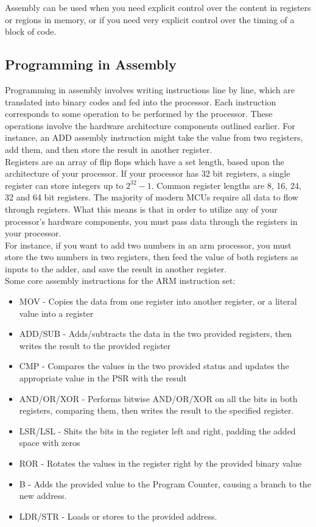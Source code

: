 \documentclass[10pt]{article}
\begin{document}
Assembly can be used when you need explicit control over the content in registers or regions in memory, or if you need very explicit control over the timing of a block of code.\\

\subsection{Programming in Assembly}
Programming in assembly involves writing instructions line by line, which are translated into binary codes and fed into the processor. Each instruction corresponds to some operation to be performed by the processor. These operations involve the hardware architecture components outlined earlier. For instance, an ADD assembly instruction might take the value from two registers, add them, and then store the result in another register. \\

Registers are an array of flip flops which have a set length, based upon the architecture of your processor. If your processor has 32 bit registers, a single register can store integers up to $2^{32}-1$. Common register lengths are 8, 16, 24, 32 and 64 bit registers. The majority of modern MCUs require all data to flow through registers. What this means is that in order to utilize any of your processor's hardware components, you must pass data through the registers in your processor. \\

For instance, if you want to add two numbers in an arm processor, you must store the two numbers in two registers, then feed the value of both registers as inputs to the adder, and save the result in another register. \\


Some core assembly instructions for the ARM instruction set:
\begin{itemize}
\item MOV - Copies the data from one register into another register, or a literal value into a register
\item ADD/SUB - Adds/subtracts the data in the two provided registers, then writes the result to the provided register
\item CMP - Compares the values in the two provided status and updates the appropriate value in the PSR with the result
\item AND/OR/XOR - Performs bitwise AND/OR/XOR on all the bits in both registers, comparing them, then writes the result to the specified register.
\item LSR/LSL - Shits the bits in the register left and right, padding the added space with zeros
\item ROR - Rotates the values in the register right by the provided binary value
\item B - Adds the provided value to the Program Counter, causing a branch to the new address.
\item LDR/STR - Loads or stores to the provided address. 
\end{itemize}  
\end{document}
